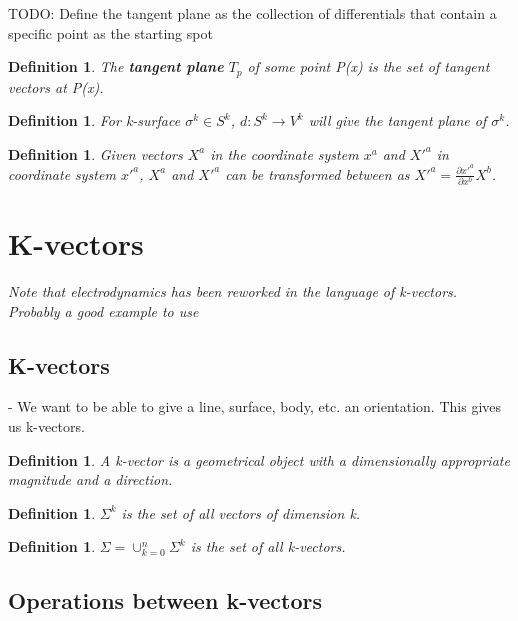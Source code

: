 \documentclass{book}
\newtheorem{defn}[equation]{Definition}
\begin{document}
 TODO: Define the tangent plane as the collection of differentials that contain a specific point as the starting spot
\begin{defn}
	The \textbf{tangent plane} $T_p$ of some point P(x) is the set of tangent vectors at P(x). 
\end{defn}
 
\begin{defn}
	For k-surface $\sigma^k \in S^k$, $d : S^k \to V^k$ will give the tangent plane of $\sigma^k$. 
\end{defn}

\begin{defn}
	Given vectors $X^a$ in the coordinate system $x^a$ and $X'^a$ in coordinate system $x'^a$, $X^a$ and $X'^a$ can be transformed between as $X'^a = \frac{\partial x'^a}{\partial x^b} X^b$. 
\end{defn}



\section{K-vectors}

\emph{Note that electrodynamics has been reworked in the language of k-vectors. Probably a good example to use}




\subsection{K-vectors}

- We want to be able to give a line, surface, body, etc. an orientation. This gives us k-vectors.

\begin{defn}
	A k-vector is a geometrical object with a dimensionally appropriate magnitude and a direction. 
\end{defn}

\begin{defn}
	$\Sigma^k$ is the set of all vectors of dimension k. 
	\end{defn}

\begin{defn}
	$\Sigma = \cup_{k=0}^n \Sigma^k$ is the set of all k-vectors. 
\end{defn}

\subsection{Operations between k-vectors}
\end{document}

